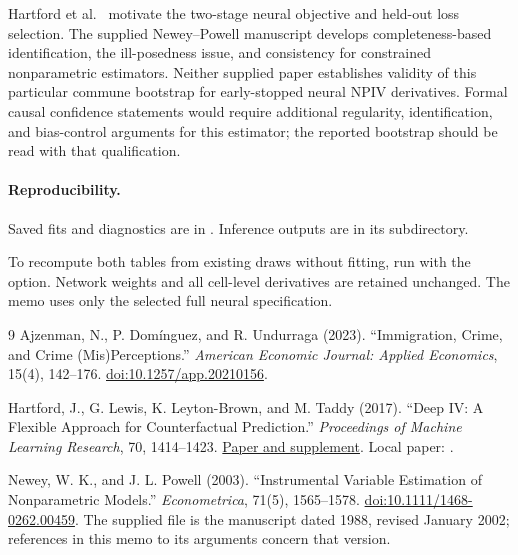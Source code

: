 \documentclass{article}
\begin{document}
Hartford et al.\ \cite{deepiv} motivate the two-stage neural objective and held-out loss selection. The supplied Newey--Powell manuscript \cite{neweypowell} develops completeness-based identification, the ill-posedness issue, and consistency for constrained nonparametric estimators. Neither supplied paper establishes validity of this particular commune bootstrap for early-stopped neural NPIV derivatives. Formal causal confidence statements would require additional regularity, identification, and bias-control arguments for this estimator; the reported bootstrap should be read with that qualification.

\paragraph{Reproducibility.}
Saved fits and diagnostics are in . Inference outputs are in its  subdirectory.

To recompute both tables from existing draws without fitting, run  with the  option. Network weights and all cell-level derivatives are retained unchanged. The memo uses only the selected full neural specification.

\begin{thebibliography}{9}
Ajzenman, N., P. Dom\'{i}nguez, and R. Undurraga (2023).
``Immigration, Crime, and Crime (Mis)Perceptions.''
\emph{American Economic Journal: Applied Economics}, 15(4), 142--176.
\href{https://doi.org/10.1257/app.20210156}{doi:10.1257/app.20210156}.

Hartford, J., G. Lewis, K. Leyton-Brown, and M. Taddy (2017).
``Deep IV: A Flexible Approach for Counterfactual Prediction.''
\emph{Proceedings of Machine Learning Research}, 70, 1414--1423.
\href{https://proceedings.mlr.press/v70/hartford17a.html}{Paper and supplement}.
Local paper: .

Newey, W. K., and J. L. Powell (2003).
``Instrumental Variable Estimation of Nonparametric Models.''
\emph{Econometrica}, 71(5), 1565--1578.
\href{https://doi.org/10.1111/1468-0262.00459}{doi:10.1111/1468-0262.00459}.
The supplied file  is the manuscript dated 1988, revised January 2002; references in this memo to its arguments concern that version.
\end{thebibliography}
\end{document}

